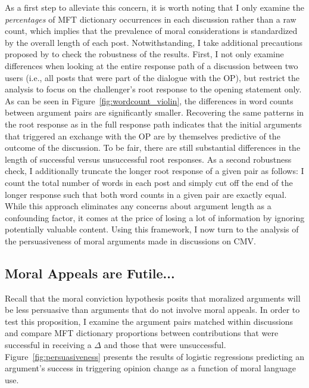 As a first step to alleviate this concern, it is worth noting that I only examine the \textit{percentages} of MFT dictionary occurrences in each discussion rather than a raw count, which implies that the prevalence of moral considerations is standardized by the overall length of each post. Notwithstanding, I take additional precautions proposed by \citet{tan2016winning} to check the robustness of the results. First, I not only examine differences when looking at the entire response path of a discussion between two users (i.e., all posts that were part of the dialogue with the OP), but restrict the analysis to focus on the challenger's root response to the opening statement only. As can be seen in Figure~\ref{fig:wordcount_violin}, the differences in word counts between argument pairs are significantly smaller. Recovering the same patterns in the root response as in the full response path indicates that the initial arguments that triggered an exchange with the OP are by themselves predictive of the outcome of the discussion. To be fair, there are still substantial differences in the length of successful versus unsuccessful root responses. As a second robustness check, I additionally truncate the longer root response of a given pair as follows: I count the total number of words in each post and simply cut off the end of the longer response such that both word counts in a given pair are exactly equal. While this approach eliminates any concerns about argument length as a confounding factor, it comes at the price of losing a lot of information by ignoring potentially valuable content. Using this framework, I now turn to the analysis of the persuasiveness of moral arguments made in discussions on CMV.


\subsection{Moral Appeals are Futile...}

Recall that the moral conviction hypothesis posits that moralized arguments will be less persuasive than arguments that do not involve moral appeals. In order to test this proposition, I examine the argument pairs matched within discussions and compare MFT dictionary proportions between contributions that were successful in receiving a $\Delta$ and those that were unsuccessful. Figure~\ref{fig:persuasiveness} presents the results of logistic regressions predicting an argument's success in triggering opinion change as a function of moral language use. 

